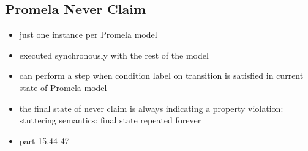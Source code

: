 \documentclass[a4paper, 10pt]{article}
\begin{document}
\subsection*{Promela Never Claim}
\begin{itemize}
    \item just one instance per Promela model
    \item executed synchronously with the rest of the model
    \item can perform a step when condition label on transition is satisfied in current state of Promela model
    \item the final state of never claim is always indicating a property violation: stuttering semantics: final state repeated forever
    \item {} part 15.44-47
\end{itemize}
\end{document}
